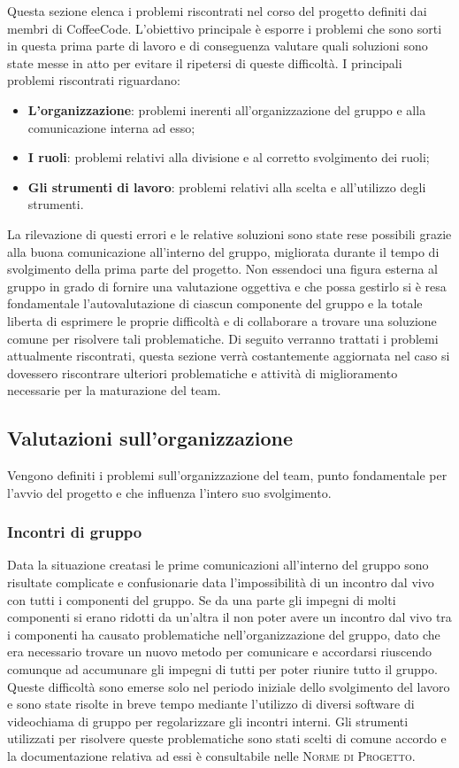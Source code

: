 \documentclass[../piano-di-qualifica.tex]{subfiles}
\begin{document}
Questa sezione elenca i problemi riscontrati nel corso del progetto definiti dai membri di CoffeeCode.
L'obiettivo principale è esporre i problemi che sono sorti in questa prima parte di lavoro e di conseguenza valutare quali soluzioni sono state messe in atto per evitare il ripetersi di queste difficoltà.
I principali problemi riscontrati riguardano:
\begin{itemize}
    \item \textbf{L'organizzazione}: problemi inerenti all'organizzazione del gruppo e alla comunicazione interna ad esso;
    \item \textbf{I ruoli}: problemi relativi alla divisione e al corretto svolgimento dei ruoli;
    \item \textbf{Gli strumenti di lavoro}: problemi relativi alla scelta e all'utilizzo degli strumenti.
\end{itemize}
La rilevazione di questi errori e le relative soluzioni sono state rese possibili grazie alla buona comunicazione all'interno del gruppo, migliorata durante il tempo di svolgimento della prima parte del progetto.
Non essendoci una figura esterna al gruppo in grado di fornire una valutazione oggettiva e che possa gestirlo si è resa fondamentale l'autovalutazione di ciascun componente del gruppo e la totale liberta di esprimere le proprie difficoltà e di collaborare a trovare una soluzione comune per risolvere tali problematiche.
Di seguito verranno trattati i problemi attualmente riscontrati, questa sezione verrà costantemente aggiornata nel caso si dovessero riscontrare ulteriori problematiche e attività di miglioramento necessarie per la maturazione del team.

\subsection{Valutazioni sull’organizzazione}
\label{sub:valutazioni_organizzazione}
Vengono definiti i problemi sull'organizzazione del team, punto fondamentale per l'avvio del progetto e che influenza l'intero suo svolgimento.

\subsubsection{Incontri di gruppo}
\label{sub:incontri_di_gruppo}
Data la situazione creatasi le prime comunicazioni all'interno del gruppo sono risultate complicate e confusionarie data l'impossibilità di un incontro dal vivo con tutti i componenti del gruppo.
Se da una parte gli impegni di molti componenti si erano ridotti da un'altra il non poter avere un incontro dal vivo tra i componenti ha causato problematiche nell'organizzazione del gruppo, dato che era necessario trovare un nuovo metodo per comunicare e accordarsi riuscendo comunque ad accumunare gli impegni di tutti per poter riunire tutto il gruppo.
Queste difficoltà sono emerse solo nel periodo iniziale dello svolgimento del lavoro e sono state risolte in breve tempo mediante l'utilizzo di diversi software di videochiama di gruppo per regolarizzare gli incontri interni.
Gli strumenti utilizzati per risolvere queste problematiche sono stati scelti di comune accordo e la documentazione relativa ad essi è consultabile nelle \textsc{Norme di Progetto}.
\end{document}
